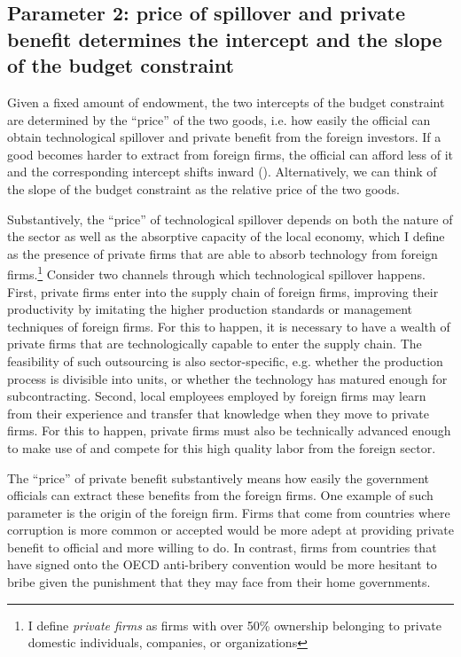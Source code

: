 \subsection{Parameter 2: price of spillover and private benefit determines the intercept and the slope of the budget constraint}

Given a fixed amount of endowment, the two intercepts of the budget constraint are determined by the ``price'' of the two goods, i.e. how easily the official can obtain technological spillover and private benefit from the foreign investors. If a good becomes harder to extract from foreign firms, the official can afford less of it and the corresponding intercept shifts inward (). Alternatively, we can think of the slope of the budget constraint as the relative price of the two goods.

Substantively, the ``price'' of technological spillover depends on both the nature of the sector as well as the absorptive capacity of the local economy, which I define as the presence of private firms that are able to absorb technology from foreign firms.\footnote{I define \textit{private firms} as firms with over 50\% ownership belonging to private domestic individuals, companies, or organizations} Consider two channels through which technological spillover happens. First, private firms enter into the supply chain of foreign firms, improving their productivity by imitating the higher production standards or management techniques of foreign firms. For this to happen, it is necessary to have a wealth of private firms that are technologically capable to enter the supply chain. The feasibility of such outsourcing is also sector-specific, e.g. whether the production process is divisible into units, or whether the technology has matured enough for subcontracting. Second, local employees employed by foreign firms may learn from their experience and transfer that knowledge when they move to private firms. For this to happen, private firms must also be technically advanced enough to make use of and compete for this high quality labor from the foreign sector.

The ``price'' of private benefit substantively means how easily the government officials can extract these benefits from the foreign firms. One example of such parameter is the origin of the foreign firm. Firms that come from countries where corruption is more common or accepted would be more adept at providing private benefit to official and more willing to do. In contrast, firms from countries that have signed onto the OECD anti-bribery convention would be more hesitant to bribe given the punishment that they may face from their home governments.

